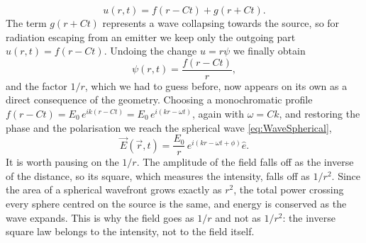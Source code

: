        \begin{equation*}
            u(r,t) = f(r - Ct) + g(r + Ct).
       \end{equation*}
       The term $g(r+Ct)$ represents a wave collapsing towards the source, so for radiation escaping from an emitter we keep only the outgoing part $u(r,t) = f(r - Ct)$. Undoing the change $u = r\psi$ we finally obtain
       \begin{equation*}
            \psi(r,t) = \frac{f(r - Ct)}{r},
       \end{equation*}
       and the factor $1/r$, which we had to guess before, now appears on its own as a direct consequence of the geometry. Choosing a monochromatic profile $f(r - Ct) = E_0\, e^{ik(r - Ct)} = E_0\, e^{i(kr - \omega t)}$, again with $\omega = Ck$, and restoring the phase and the polarisation we reach the spherical wave \ref{eq:WaveSpherical},
       \begin{equation*}
            \vec{E}(\vec{r},t) = \frac{E_0}{r}\, e^{i\left(kr - \omega t + \phi\right)}\hat{e}.
       \end{equation*}
       It is worth pausing on the $1/r$. The amplitude of the field falls off as the inverse of the distance, so its square, which measures the intensity, falls off as $1/r^2$. Since the area of a spherical wavefront grows exactly as $r^2$, the total power crossing every sphere centred on the source is the same, and energy is conserved as the wave expands. This is why the field goes as $1/r$ and not as $1/r^2$: the inverse square law belongs to the intensity, not to the field itself.

